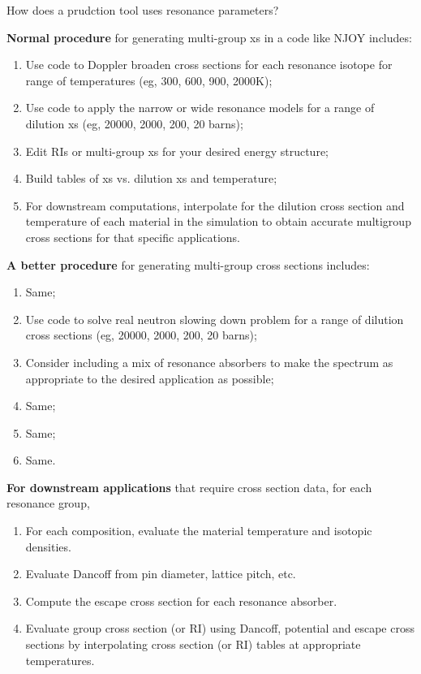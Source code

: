 \documentclass{school-22.211-notes}
\begin{document}
How does a prudction tool uses resonance parameters?

\textbf{Normal procedure} for generating multi-group xs in a code like NJOY includes:
\begin{enumerate}
\item Use code to Doppler broaden cross sections for each resonance isotope for range of temperatures (eg, 300, 600, 900, 2000K); 
\item Use code to apply the narrow or wide resonance models for a range of dilution xs (eg, 20000, 2000, 200, 20 barns); 
\item Edit RIs or multi-group xs for your desired energy structure; 
\item Build tables of xs vs. dilution xs and temperature;
\item For downstream computations, interpolate for the dilution cross section and temperature of each material in the simulation to obtain accurate multigroup cross sections for that specific applications. 
\end{enumerate}

\textbf{A better procedure} for generating multi-group cross sections includes:
\begin{enumerate}
\item Same;
\item Use code to solve real neutron slowing down problem for a range of dilution cross sections (eg, 20000, 2000, 200, 20 barns);
\item Consider including a mix of resonance absorbers to make the spectrum as appropriate to the desired application as possible;
\item Same;
\item Same;
\item Same.
\end{enumerate}

\textbf{For downstream applications} that require cross section data, for each resonance group,
\begin{enumerate}
\item For each composition, evaluate the material temperature and isotopic densities. 
\item Evaluate Dancoff from pin diameter, lattice pitch, etc. 
\item Compute the escape cross section for each resonance absorber.
\item Evaluate group cross section (or RI) using Dancoff, potential and escape cross sections by interpolating cross section (or RI) tables at appropriate temperatures. 
\end{enumerate}
\end{document}
